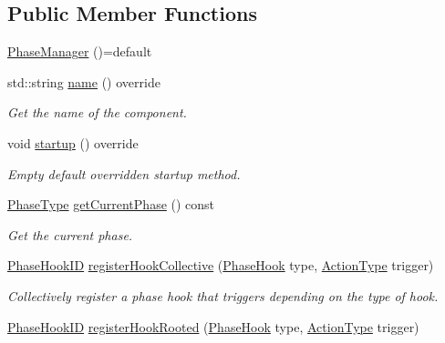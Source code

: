 \subsection*{Public Member Functions}
\begin{DoxyCompactItemize}
\item 
\hyperlink{structvt_1_1phase_1_1_phase_manager_af2b50706948fb9c1ad4b561ac9933040}{Phase\+Manager} ()=default
\item 
std\+::string \hyperlink{structvt_1_1phase_1_1_phase_manager_a159d95eca1eedeef33f245a3c232037d}{name} () override
\begin{DoxyCompactList}\small\item\em Get the name of the component. \end{DoxyCompactList}\item 
void \hyperlink{structvt_1_1phase_1_1_phase_manager_a541d1f6c7a350fad979911ac60f38025}{startup} () override
\begin{DoxyCompactList}\small\item\em Empty default overridden startup method. \end{DoxyCompactList}\item 
\hyperlink{namespacevt_a46ce6733d5cdbd735d561b7b4029f6d7}{Phase\+Type} \hyperlink{structvt_1_1phase_1_1_phase_manager_a217ff68fb553eedf12c9f4947a977ebd}{get\+Current\+Phase} () const
\begin{DoxyCompactList}\small\item\em Get the current phase. \end{DoxyCompactList}\item 
\hyperlink{structvt_1_1phase_1_1_phase_hook_i_d}{Phase\+Hook\+ID} \hyperlink{structvt_1_1phase_1_1_phase_manager_a31f6a6f91315fb68826ee073a7cb0a14}{register\+Hook\+Collective} (\hyperlink{namespacevt_1_1phase_aec9a63fdd99680d7a7fe99d321193811}{Phase\+Hook} type, \hyperlink{namespacevt_ae0a5a7b18cc99d7b732cb4d44f46b0f3}{Action\+Type} trigger)
\begin{DoxyCompactList}\small\item\em Collectively register a phase hook that triggers depending on the type of hook. \end{DoxyCompactList}\item 
\hyperlink{structvt_1_1phase_1_1_phase_hook_i_d}{Phase\+Hook\+ID} \hyperlink{structvt_1_1phase_1_1_phase_manager_a61a1797497a522f9352fe64abf3753be}{register\+Hook\+Rooted} (\hyperlink{namespacevt_1_1phase_aec9a63fdd99680d7a7fe99d321193811}{Phase\+Hook} type, \hyperlink{namespacevt_ae0a5a7b18cc99d7b732cb4d44f46b0f3}{Action\+Type} trigger)

\end{DoxyCompactItemize}
